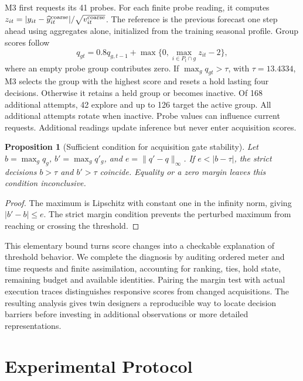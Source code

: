 \documentclass[conference]{IEEEtran}
\newtheorem{proposition}{Proposition}
\begin{document}
M3 first requests its 41 probes. For each finite probe reading, it computes $z_{it}=|y_{it}-\widehat y^{\rm coarse}_{it}|/\sqrt{v^{\rm coarse}_{it}}$. The reference is the previous forecast one step ahead using aggregates alone, initialized from the training seasonal profile. Group scores follow
\begin{equation}
q_{gt}=0.8q_{g,t-1}+\max\{0,\max_{i\in P_t\cap g}z_{it}-2\},\label{eq:score}
\end{equation}
where an empty probe group contributes zero. If $\max_gq_{gt}>\tau$, with $\tau=13.4334$, M3 selects the group with the highest score and resets a hold lasting four decisions. Otherwise it retains a held group or becomes inactive. Of 168 additional attempts, 42 explore and up to 126 target the active group. All additional attempts rotate when inactive. Probe values can influence current requests. Additional readings update inference but never enter acquisition scores.

\begin{proposition}[Sufficient condition for acquisition gate stability]
Let $b=\max_gq_g$, $b'=\max_gq'_g$, and $e=\|q'-q\|_\infty$. If $e<|b-\tau|$, the strict decisions $b>\tau$ and $b'>\tau$ coincide. Equality or a zero margin leaves this condition inconclusive.
\end{proposition}
\begin{proof}
The maximum is Lipschitz with constant one in the infinity norm, giving $|b'-b|\le e$. The strict margin condition prevents the perturbed maximum from reaching or crossing the threshold.
\end{proof}

This elementary bound turns score changes into a checkable explanation of threshold behavior. We complete the diagnosis by auditing ordered meter and time requests and finite assimilation, accounting for ranking, ties, hold state, remaining budget and available identities. Pairing the margin test with actual execution traces distinguishes responsive scores from changed acquisitions. The resulting analysis gives twin designers a reproducible way to locate decision barriers before investing in additional observations or more detailed representations.









\section{Experimental Protocol}
\end{document}
